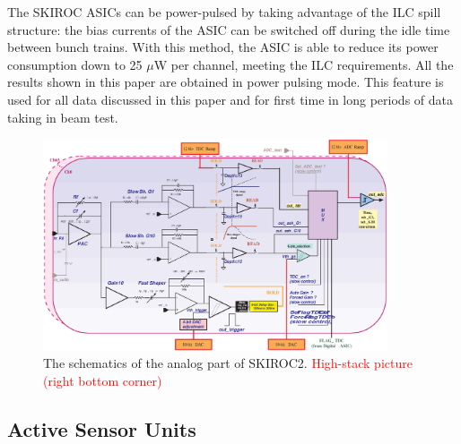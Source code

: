 \documentclass[a4paper,11pt]{article}
\newcommand{\todo}[1]{\textcolor{red}{{#1}}}
\begin{document}
The SKIROC ASICs can be power-pulsed by taking advantage of the ILC spill structure: 
the bias currents of the ASIC can be switched off during the idle time between bunch trains.
With this method, the ASIC is able to reduce its power consumption down to 25 $\mu$W per channel,
meeting the ILC requirements. All the results shown in this paper are obtained in power pulsing mode.
This feature is used for all data discussed in this paper
and for first time in long periods of data taking in beam test.

\begin{figure}[!t]
  \centering
    \includegraphics[width=4in]{../figs/skiroc2_block.eps}
\caption{The schematics of the analog part of SKIROC2. \todo{High-stack picture (right bottom corner)}}
\label{SKIROC2}
\end{figure}

\subsection{Active Sensor Units}
\label{sec:ASU}
\end{document}
